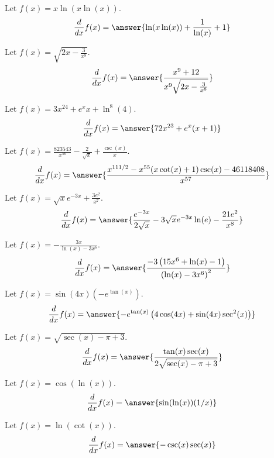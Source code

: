 \documentclass{ximera}
\begin{document}
\begin{shuffle}
\begin{exercise}
Let $f(x)=x \ln (x \ln (x))$.
\[
\ddx f(x) = \answer{\ln (x \ln (x))+\frac{1}{\ln (x)}+1}
\]
\end{exercise}

\begin{exercise}
Let $f(x)=\sqrt{2 x-\frac{3}{x^8}}$.
\[
\ddx f(x) = \answer{\frac{x^9+12}{x^9 \sqrt{2 x-\frac{3}{x^8}}}}
\]
\end{exercise}

\begin{exercise}
Let $f(x)=3 x^{24}+e^x x+\ln ^8(4)$.
\[
\ddx f(x) = \answer{72 x^{23}+e^x (x+1)}
\]
\end{exercise}

\begin{exercise}
Let $f(x)=\frac{823543}{x^{56}}-\frac{2}{\sqrt{x}}+\frac{\csc (x)}{x}$.
\[
\ddx f(x) = \answer{\frac{x^{111/2}-x^{55} (x \cot (x)+1) \csc (x)-46118408}{x^{57}}}
\]
\end{exercise}

\begin{exercise}
Let $f(x)=\sqrt{x} e^{-3 x}+\frac{3 e^2}{x^7}$.
\[
\ddx f(x) = \answer{\frac{e^{-3 x}}{2 \sqrt{x}}-3 \sqrt{x} e^{-3 x} \ln (e)-\frac{21 e^2}{x^8}}
\]
\end{exercise}

\begin{exercise}
Let $f(x)=-\frac{3 x}{\ln (x)-3 x^6}$.
\[
\ddx f(x) = \answer{\frac{-3 \left(15 x^6+\ln (x)-1\right)}{\left(\ln (x)-3 x^6\right)^2}}
\]
\end{exercise}

\begin{exercise}
Let $f(x)=\sin (4 x) \left(-e^{\tan (x)}\right)$.
\[
\ddx f(x) = \answer{-e^{\tan (x)} \left(4 \cos (4 x)+\sin (4 x) \sec ^2(x)\right)}
\]
\end{exercise}

\begin{exercise}
Let $f(x)=\sqrt{\sec (x)-\pi +3}$.
\[
\ddx f(x) = \answer{\frac{\tan (x) \sec (x)}{2 \sqrt{\sec (x)-\pi +3}}}
\]
\end{exercise}

\begin{exercise}
Let $f(x)=\cos (\ln (x))$.
\[
\ddx f(x) = \answer{\sin (\ln (x))(1/x)}
\]
\end{exercise}

\begin{exercise}
Let $f(x)=\ln (\cot (x))$.
\[
\ddx f(x) = \answer{-\csc (x) \sec (x)}
\]
\end{exercise}


\end{shuffle}
\end{document}
